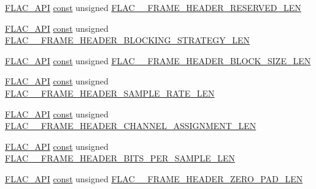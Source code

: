 \begin{DoxyCompactItemize}
\item 
\hyperlink{group__flac__export_ga56ca07df8a23310707732b1c0007d6f5}{F\+L\+A\+C\+\_\+\+A\+PI} \hyperlink{getopt1_8c_a2c212835823e3c54a8ab6d95c652660e}{const} unsigned \hyperlink{group__flac__format_ga70f1f45eade9d2972370a4b35e937822}{F\+L\+A\+C\+\_\+\+\_\+\+F\+R\+A\+M\+E\+\_\+\+H\+E\+A\+D\+E\+R\+\_\+\+R\+E\+S\+E\+R\+V\+E\+D\+\_\+\+L\+EN}
\item 
\hyperlink{group__flac__export_ga56ca07df8a23310707732b1c0007d6f5}{F\+L\+A\+C\+\_\+\+A\+PI} \hyperlink{getopt1_8c_a2c212835823e3c54a8ab6d95c652660e}{const} unsigned \hyperlink{group__flac__format_ga06bb43ed744b3d1c79628a8a9146c064}{F\+L\+A\+C\+\_\+\+\_\+\+F\+R\+A\+M\+E\+\_\+\+H\+E\+A\+D\+E\+R\+\_\+\+B\+L\+O\+C\+K\+I\+N\+G\+\_\+\+S\+T\+R\+A\+T\+E\+G\+Y\+\_\+\+L\+EN}
\item 
\hyperlink{group__flac__export_ga56ca07df8a23310707732b1c0007d6f5}{F\+L\+A\+C\+\_\+\+A\+PI} \hyperlink{getopt1_8c_a2c212835823e3c54a8ab6d95c652660e}{const} unsigned \hyperlink{group__flac__format_ga32eacb5eab350bd660144035e2b566c8}{F\+L\+A\+C\+\_\+\+\_\+\+F\+R\+A\+M\+E\+\_\+\+H\+E\+A\+D\+E\+R\+\_\+\+B\+L\+O\+C\+K\+\_\+\+S\+I\+Z\+E\+\_\+\+L\+EN}
\item 
\hyperlink{group__flac__export_ga56ca07df8a23310707732b1c0007d6f5}{F\+L\+A\+C\+\_\+\+A\+PI} \hyperlink{getopt1_8c_a2c212835823e3c54a8ab6d95c652660e}{const} unsigned \hyperlink{group__flac__format_gaff504888e04725e4f448ac297c293b76}{F\+L\+A\+C\+\_\+\+\_\+\+F\+R\+A\+M\+E\+\_\+\+H\+E\+A\+D\+E\+R\+\_\+\+S\+A\+M\+P\+L\+E\+\_\+\+R\+A\+T\+E\+\_\+\+L\+EN}
\item 
\hyperlink{group__flac__export_ga56ca07df8a23310707732b1c0007d6f5}{F\+L\+A\+C\+\_\+\+A\+PI} \hyperlink{getopt1_8c_a2c212835823e3c54a8ab6d95c652660e}{const} unsigned \hyperlink{group__flac__format_ga7a0fd74605d24347c4b486d2a62825bd}{F\+L\+A\+C\+\_\+\+\_\+\+F\+R\+A\+M\+E\+\_\+\+H\+E\+A\+D\+E\+R\+\_\+\+C\+H\+A\+N\+N\+E\+L\+\_\+\+A\+S\+S\+I\+G\+N\+M\+E\+N\+T\+\_\+\+L\+EN}
\item 
\hyperlink{group__flac__export_ga56ca07df8a23310707732b1c0007d6f5}{F\+L\+A\+C\+\_\+\+A\+PI} \hyperlink{getopt1_8c_a2c212835823e3c54a8ab6d95c652660e}{const} unsigned \hyperlink{group__flac__format_gae4267632e12c4d6dc514f6bf139865c7}{F\+L\+A\+C\+\_\+\+\_\+\+F\+R\+A\+M\+E\+\_\+\+H\+E\+A\+D\+E\+R\+\_\+\+B\+I\+T\+S\+\_\+\+P\+E\+R\+\_\+\+S\+A\+M\+P\+L\+E\+\_\+\+L\+EN}
\item 
\hyperlink{group__flac__export_ga56ca07df8a23310707732b1c0007d6f5}{F\+L\+A\+C\+\_\+\+A\+PI} \hyperlink{getopt1_8c_a2c212835823e3c54a8ab6d95c652660e}{const} unsigned \hyperlink{group__flac__format_ga11aca6c74654d45939efafcbc3d225bf}{F\+L\+A\+C\+\_\+\+\_\+\+F\+R\+A\+M\+E\+\_\+\+H\+E\+A\+D\+E\+R\+\_\+\+Z\+E\+R\+O\+\_\+\+P\+A\+D\+\_\+\+L\+EN}

\end{DoxyCompactItemize}
